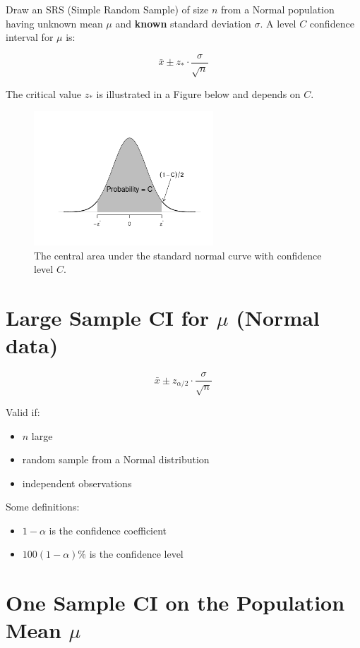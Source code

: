 Draw an SRS (Simple Random Sample) of size $n$ from a Normal population having unknown mean $\mu$ and \textbf{known} standard deviation $\sigma$. A level $C$ confidence interval for $\mu$ is:

\[
\bar{x} \pm z_{\ast} \cdot \frac{\sigma}{\sqrt{n}}
\]

The critical value $z_{\ast}$ is illustrated in a Figure below and depends on $C$.

\begin{figure}[h!]
  \centering
  \includegraphics[width=0.6\textwidth]{Section6/images/normal_confidence_curve.pdf}
  \caption{The central area under the standard normal curve with confidence level \( C \).}
\end{figure}

\section*{Large Sample CI for $\mu$ (Normal data)}

\[
\bar{x} \pm z_{\alpha/2} \cdot \frac{\sigma}{\sqrt{n}}
\]

Valid if:
\begin{itemize}
  \item $n$ large
  \item random sample from a Normal distribution
  \item independent observations
\end{itemize}

Some definitions:
\begin{itemize}
  \item $1 - \alpha$ is the confidence coefficient
  \item $100(1 - \alpha)\%$ is the confidence level
\end{itemize}


\section*{One Sample CI on the Population Mean $\mu$}


